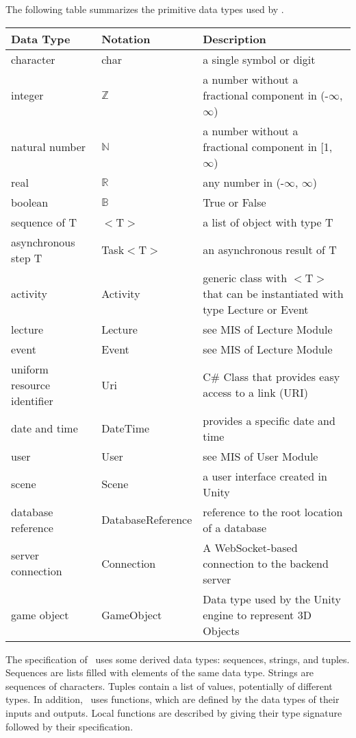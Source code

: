 \documentclass[12pt, titlepage]{article}
\begin{document}
The following table summarizes the primitive data types used by \progname. 

\begin{center}
\renewcommand{\arraystretch}{1.2}
\noindent 
\begin{tabular}{l l p{7.5cm}} 
\toprule 
\textbf{Data Type} & \textbf{Notation} & \textbf{Description}\\ 
\midrule
character & char & a single symbol or digit\\
integer & $\mathbb{Z}$ & a number without a fractional component in (-$\infty$, $\infty$) \\
natural number & $\mathbb{N}$ & a number without a fractional component in [1, $\infty$) \\
real & $\mathbb{R}$ & any number in (-$\infty$, $\infty$)\\
boolean & $\mathbb{B}$ & True or False\\
sequence of T & $<$T$>$ & a list of object with type T\\
asynchronous step T & Task$<$T$>$ & an asynchronous result of T\\
activity & Activity & generic class with $<$T$>$ that can be instantiated with type Lecture or Event\\
lecture & Lecture & see MIS of Lecture Module \\
event & Event & see MIS of Lecture Module \\
uniform resource identifier & Uri & C\# Class that provides easy access to a link (URI) \\
date and time & DateTime & provides a specific date and time \\
user & User & see MIS of User Module \\
scene & Scene & a user interface created in Unity \\
database reference & DatabaseReference & reference to the root location of a database \\
server connection & Connection & A WebSocket-based connection to the backend server \\
game object & GameObject & Data type used by the Unity engine to represent 3D Objects \\


\bottomrule
\end{tabular} 
\end{center}

\noindent
The specification of \progname \ uses some derived data types: sequences, strings, and
tuples. Sequences are lists filled with elements of the same data type. Strings
are sequences of characters. Tuples contain a list of values, potentially of
different types. In addition, \progname \ uses functions, which
are defined by the data types of their inputs and outputs. Local functions are
described by giving their type signature followed by their specification.
\end{document}
